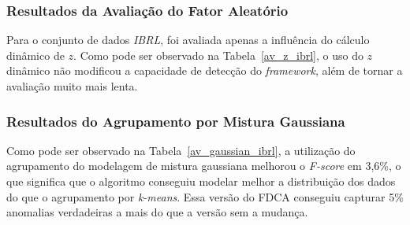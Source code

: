 \documentclass[cic,tc]{iiufrgs}
\begin{document}
\subsubsection{Resultados da Avaliação do Fator Aleatório}
\label{ibrl_FA}
Para o conjunto de dados \textit{IBRL}, foi avaliada apenas a influência do cálculo dinâmico de $z$. Como pode ser observado na Tabela~\ref{av_z_ibrl}, o uso do $z$ dinâmico não modificou a capacidade de detecção do \textit{framework}, além de tornar a avaliação muito mais lenta.

\bigskip
\begin{table}[h]
\begin{adjustwidth}{-.5in}{-.5in}
    \caption{Avaliação do fator aleatório do FDCA para o conjunto de dados \textit{IBRL}}
    \bigskip
    \begin{center}
    \label{av_z_ibrl}
    \end{center}
\end{adjustwidth}
\end{table}

\subsubsection{Resultados do Agrupamento por Mistura Gaussiana}
\label{mistura_ibrl}
Como pode ser observado na Tabela~\ref{av_gaussian_ibrl}, a utilização do agrupamento do modelagem de mistura gaussiana melhorou o \textit{F-score} em 3,6\%, o que significa que o algoritmo conseguiu modelar melhor a distribuição dos dados do que o agrupamento por \textit{k-means}. Essa versão do FDCA conseguiu capturar 5\% anomalias verdadeiras a mais do que a versão sem a mudança.
\end{document}
